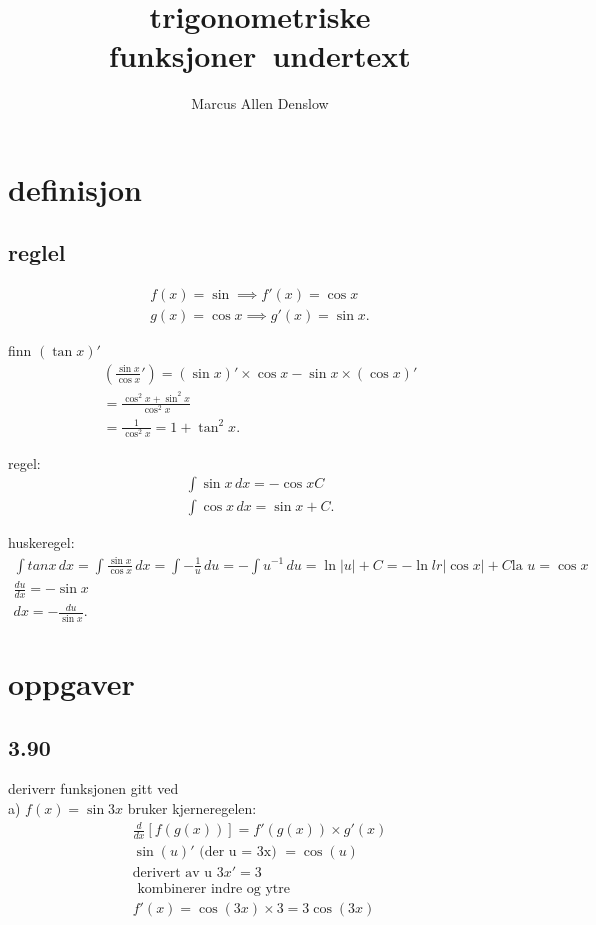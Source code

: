 \documentclass{report}
\title{\Huge{trigonometriske funksjoner}\ undertext}
\author{\Huge{Marcus Allen Denslow}}
\date{}
\begin{document}
\maketitle
\newpage%
\tableofcontents
\pagebreak

\chapter{definisjon}
\section{reglel}
\begin{align*}
f(x) = \sin  \implies f'(x) = \cos x \\
g(x) = \cos x \implies g'(x) =  \sin x
.\end{align*}

finn $\left( \tan x \right)'$
\begin{align*}
    \left( \frac{\sin x}{\cos x}' \right)  = \left( \sin x \right)' \times \cos x - \sin x \times \left( \cos x \right)' \\
	= \frac{\cos ^2 x + \sin ^2 x}{\cos^2 x} \\
	= \frac{1}{\cos ^2 x} = 1 + \tan^2 x
.\end{align*}

regel:
\begin{align*}
    \int \sin x \, dx = -\cos x  C\\
	\int  \cos x \, dx = \sin x + C
.\end{align*}

huskeregel:
\begin{align*}
    \int tan x \, dx = \int \frac{\sin x}{\cos x} \, dx = \int - \frac{1}{u} \, du= - \int u^{-1} \, du = \ln \left| u \right|  + C = -\ln lr\left|\cos x  \right| + C
	\text{la } u = \cos x\\
	\frac{du}{dx} = -\sin x\\
	dx = - \frac{du}{\sin x}
.\end{align*}

\chapter{oppgaver}
\section{3.90}
deriverr funksjonen gitt ved\\
a) $\displaystyle f(x) = \sin 3x$
bruker kjerneregelen:
\begin{align*}
	\frac{d}{dx} \left[ f(g(x)) \right] = f'(g(x)) \times g'(x)\\
	\sin(u)' \text{ (der u = 3x) } = \cos(u)\\
	\text{derivert av u } 3x' = 3\\
	\text{ kombinerer indre og ytre } \\
	f'(x) = \cos(3x) \times 3 = 3\cos(3x)
\end{align*}
\end{document}
